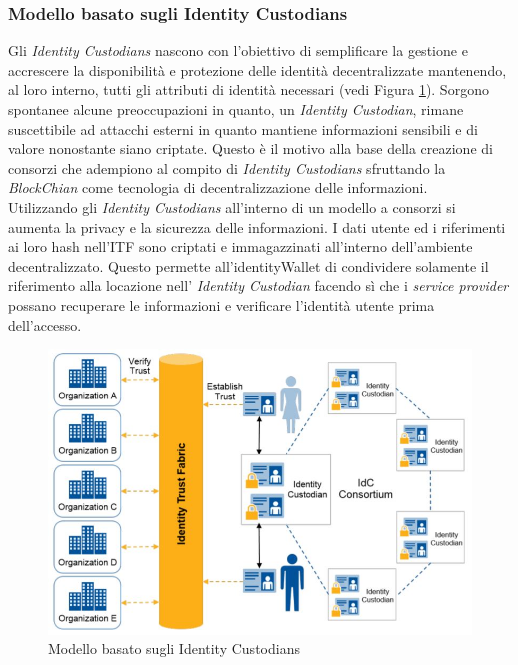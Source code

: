 \subsubsection{Modello basato sugli Identity Custodians}
Gli \textit{Identity Custodians} nascono con l'obiettivo di semplificare la gestione e accrescere la disponibilità e protezione delle identità decentralizzate mantenendo, al loro interno, tutti gli attributi di identità necessari (vedi Figura \ref{img:identityCustodians}).
Sorgono spontanee alcune preoccupazioni in quanto, un \textit{Identity Custodian}, rimane suscettibile ad attacchi esterni in quanto mantiene informazioni sensibili e di valore nonostante siano criptate. Questo è il motivo alla base della creazione di consorzi che adempiono al compito di \textit{Identity Custodians} sfruttando la \textit{BlockChian} come tecnologia di decentralizzazione delle informazioni.\\
Utilizzando gli \textit{Identity Custodians} all'interno di un modello a consorzi si aumenta la privacy e la sicurezza delle informazioni. I dati utente ed i riferimenti ai loro hash nell'\gls{ITF} sono criptati e immagazzinati all'interno dell'ambiente decentralizzato. Questo permette all'\gls{identityWallet} di condividere solamente il riferimento alla locazione nell' \textit{Identity Custodian} facendo sì che i \textit{service provider} possano recuperare le informazioni e verificare l'identità utente prima dell'accesso\cite{ITF_gartner}.
\begin{figure}[h]
	\centering
	\includegraphics[scale=0.50]{immagini/ITF_IdentityCustodians}
	\caption{Modello basato sugli Identity Custodians}
	\label{img:identityCustodians}
\end{figure}

